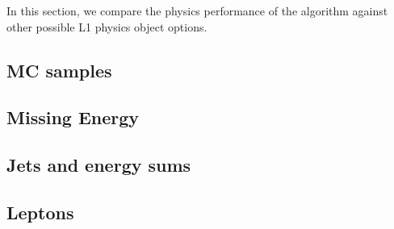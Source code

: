 In this section, we compare the physics performance of the algorithm against other possible L1 physics object options.

\subsection{MC samples}

\subsection{Missing Energy}

\subsection{Jets and energy sums}

\subsection{Leptons}